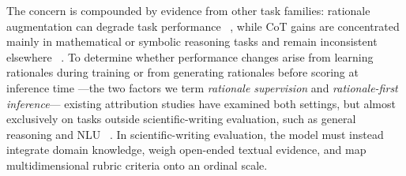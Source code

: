 
The concern is compounded by evidence from other task families:
rationale augmentation can degrade task performance
~\citep{zhu-etal-2025-rationales},
while CoT gains are concentrated mainly in mathematical or symbolic reasoning tasks
and remain inconsistent elsewhere
~\citep{sprague-etal-2025-cot}.
To determine whether performance changes arise from learning rationales during training
or from generating rationales before scoring at inference time
---the two factors we term \emph{rationale supervision} and \emph{rationale-first inference}---
existing attribution studies have examined both settings,
but almost exclusively on tasks outside scientific-writing evaluation,
such as general reasoning and NLU
~\citep{wadhwa-etal-2024-investigating,shi-etal-2025-investigating}.
In scientific-writing evaluation, the model must instead integrate
domain knowledge, weigh open-ended textual evidence, and map
multidimensional rubric criteria onto an ordinal scale.

%
%
%

